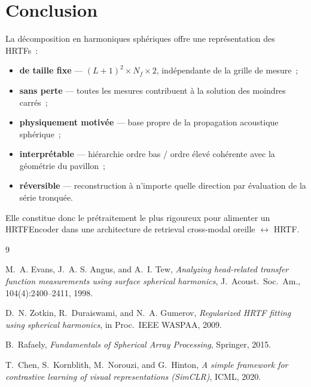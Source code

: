 \documentclass[12pt, a4paper]{article}
\begin{document}
\section{Conclusion}

La décomposition en harmoniques sphériques offre une représentation des HRTFs~:
\begin{itemize}
    \item \textbf{de taille fixe} — $(L+1)^2 \times N_f \times 2$, indépendante de
    la grille de mesure~;
    \item \textbf{sans perte} — toutes les mesures contribuent à la solution des
    moindres carrés~;
    \item \textbf{physiquement motivée} — base propre de la propagation acoustique
    sphérique~;
    \item \textbf{interprétable} — hiérarchie ordre bas / ordre élevé cohérente avec
    la géométrie du pavillon~;
    \item \textbf{réversible} — reconstruction à n'importe quelle direction par
    évaluation de la série tronquée.
\end{itemize}

Elle constitue donc le prétraitement le plus rigoureux pour alimenter un
HRTFEncoder dans une architecture de retrieval cross-modal oreille $\leftrightarrow$
HRTF.

\begin{thebibliography}{9}

M.~A. Evans, J.~A. S. Angus, and A.~I. Tew,
\textit{Analyzing head-related transfer function measurements using surface spherical harmonics},
J.\ Acoust.\ Soc.\ Am., 104(4):2400--2411, 1998.

D.~N. Zotkin, R.~Duraiswami, and N.~A. Gumerov,
\textit{Regularized HRTF fitting using spherical harmonics},
in Proc.\ IEEE WASPAA, 2009.

B.~Rafaely,
\textit{Fundamentals of Spherical Array Processing},
Springer, 2015.

T.~Chen, S.\ Kornblith, M.\ Norouzi, and G.\ Hinton,
\textit{A simple framework for contrastive learning of visual representations (SimCLR)},
ICML, 2020.

\end{thebibliography}
\end{document}

